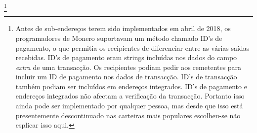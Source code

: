 \footnote{Antes de sub-endereços terem sido implementados em abril de 2018, os programadores de Monero suportavam um método chamado ID's de pagamento, o que permitia os recipientes de diferenciar entre as várias saídas recebidas. ID's de pagamento eram strings incluídas nos dados do campo {\em extra} de uma transacção. Os recipientes podiam pedir aos remetentes para incluir um ID de pagamento nos dados de transacção. ID's de transacção também podiam ser incluídos em endereços integrados. ID's de pagamento e endereços integrados não afectam a verificação da transacção. Portanto isso ainda pode ser implementado por qualquer pessoa, mas desde que isso está presentemente descontinuado nas carteiras mais populares escolheu-se não esplicar isso aqui.} 

